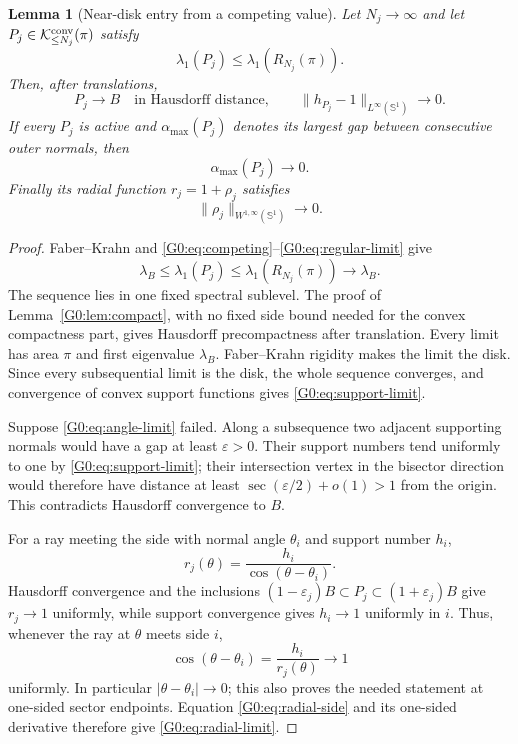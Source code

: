 \documentclass[11pt]{amsart}
\numberwithin{equation}{section}
\newtheorem{lemma}[theorem]{Lemma}
\theoremstyle{definition}
\theoremstyle{remark}
\newcommand{\Kclass}{\mathcal K}
\begin{document}
\begin{lemma}[Near-disk entry from a competing value]
\label{G0:lem:entry}
Let $N_j\to\infty$ and let
$P_j\in\Kclass_{\le N_j}^{\rm conv}(\pi)$ satisfy
\begin{equation}\label{G0:eq:competing}
 \lambda_1(P_j)\le\lambda_1(R_{N_j}(\pi)).
\end{equation}
Then, after translations,
\begin{equation}\label{G0:eq:support-limit}
 P_j\longrightarrow B\quad\text{in Hausdorff distance},\qquad
 \|h_{P_j}-1\|_{L^\infty(\mathbb S^1)}\longrightarrow0.
\end{equation}
If every $P_j$ is active and $\alpha_{\max}(P_j)$ denotes its largest
gap between consecutive outer normals, then
\begin{equation}\label{G0:eq:angle-limit}
 \alpha_{\max}(P_j)\longrightarrow0.
\end{equation}
Finally its radial function $r_j=1+\rho_j$ satisfies
\begin{equation}\label{G0:eq:radial-limit}
 \|\rho_j\|_{W^{1,\infty}(\mathbb S^1)}\longrightarrow0.
\end{equation}
\end{lemma}

\begin{proof}
Faber--Krahn and \eqref{G0:eq:competing}--\eqref{G0:eq:regular-limit} give
\[
 \lambda_B\le\lambda_1(P_j)
 \le\lambda_1(R_{N_j}(\pi))\longrightarrow\lambda_B.
\]
The sequence lies in one fixed spectral sublevel.  The proof of
Lemma~\ref{G0:lem:compact}, with no fixed side bound needed for the convex
compactness part, gives Hausdorff precompactness after translation.
Every limit has area $\pi$ and first eigenvalue $\lambda_B$.
Faber--Krahn rigidity makes the limit the disk.  Since every subsequential
limit is the disk, the whole sequence converges, and convergence of convex
support functions gives \eqref{G0:eq:support-limit}.

Suppose \eqref{G0:eq:angle-limit} failed.  Along a subsequence two adjacent
supporting normals would have a gap at least $\varepsilon>0$.  Their
support numbers tend uniformly to one by \eqref{G0:eq:support-limit}; their
intersection vertex in the bisector direction would therefore have
distance at least $\sec(\varepsilon/2)+o(1)>1$ from the origin.  This
contradicts Hausdorff convergence to $B$.

For a ray meeting the side with normal angle $\theta_i$ and support
number $h_i$,
\begin{equation}\label{G0:eq:radial-side}
 r_j(\theta)=\frac{h_i}{\cos(\theta-\theta_i)}.
\end{equation}
Hausdorff convergence and the inclusions
$(1-\varepsilon_j)B\subset P_j\subset(1+\varepsilon_j)B$ give
$r_j\to1$ uniformly, while support convergence gives $h_i\to1$
uniformly in $i$.  Thus, whenever the ray at $\theta$ meets side $i$,
\[
 \cos(\theta-\theta_i)=\frac{h_i}{r_j(\theta)}\longrightarrow1
\]
uniformly.  In particular $|\theta-\theta_i|\to0$; this also proves the
needed statement at one-sided sector endpoints.  Equation
\eqref{G0:eq:radial-side} and its one-sided derivative therefore give
\eqref{G0:eq:radial-limit}.
\end{proof}
\end{document}
